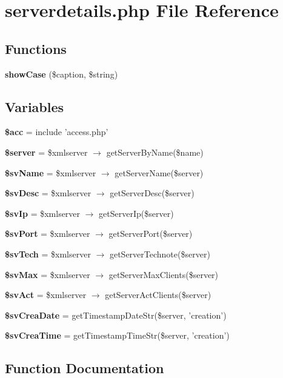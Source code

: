 \section{serverdetails.php File Reference}
\label{serverdetails_8php}


\subsection*{Functions}
\begin{CompactItemize}
\item 
{\bf show\-Case} (\$caption, \$string)
\end{CompactItemize}
\subsection*{Variables}
\begin{CompactItemize}
\item 
{\bf \$acc} = include 'access.php'
\item 
{\bf \$server} = \$xmlserver $\rightarrow$ get\-Server\-By\-Name(\$name)
\item 
{\bf \$sv\-Name} = \$xmlserver $\rightarrow$ get\-Server\-Name(\$server)
\item 
{\bf \$sv\-Desc} = \$xmlserver $\rightarrow$ get\-Server\-Desc(\$server)
\item 
{\bf \$sv\-Ip} = \$xmlserver $\rightarrow$ get\-Server\-Ip(\$server)
\item 
{\bf \$sv\-Port} = \$xmlserver $\rightarrow$ get\-Server\-Port(\$server)
\item 
{\bf \$sv\-Tech} = \$xmlserver $\rightarrow$ get\-Server\-Technote(\$server)
\item 
{\bf \$sv\-Max} = \$xmlserver $\rightarrow$ get\-Server\-Max\-Clients(\$server)
\item 
{\bf \$sv\-Act} = \$xmlserver $\rightarrow$ get\-Server\-Act\-Clients(\$server)
\item 
{\bf \$sv\-Crea\-Date} = get\-Timestamp\-Date\-Str(\$server, 'creation')
\item 
{\bf \$sv\-Crea\-Time} = get\-Timestamp\-Time\-Str(\$server, 'creation')
\end{CompactItemize}


\subsection{Function Documentation}
